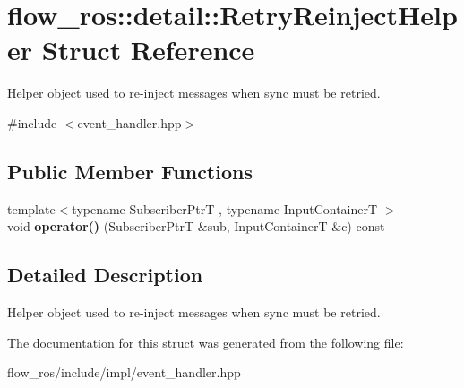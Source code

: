 \hypertarget{structflow__ros_1_1detail_1_1_retry_reinject_helper}{}\section{flow\+\_\+ros\+:\+:detail\+:\+:Retry\+Reinject\+Helper Struct Reference}
\label{structflow__ros_1_1detail_1_1_retry_reinject_helper}


Helper object used to re-\/inject messages when sync must be retried.  




{\ttfamily \#include $<$event\+\_\+handler.\+hpp$>$}

\subsection*{Public Member Functions}
\begin{DoxyCompactItemize}
\item 
\mbox{\label{structflow__ros_1_1detail_1_1_retry_reinject_helper_aa9c04d29be83c42005e66d9118e02ed4}} 
{\footnotesize template$<$typename Subscriber\+PtrT , typename Input\+ContainerT $>$ }\\void {\bfseries operator()} (Subscriber\+PtrT \&sub, Input\+ContainerT \&c) const
\end{DoxyCompactItemize}


\subsection{Detailed Description}
Helper object used to re-\/inject messages when sync must be retried. 

The documentation for this struct was generated from the following file\+:\begin{DoxyCompactItemize}
\item 
flow\+\_\+ros/include/impl/event\+\_\+handler.\+hpp\end{DoxyCompactItemize}
